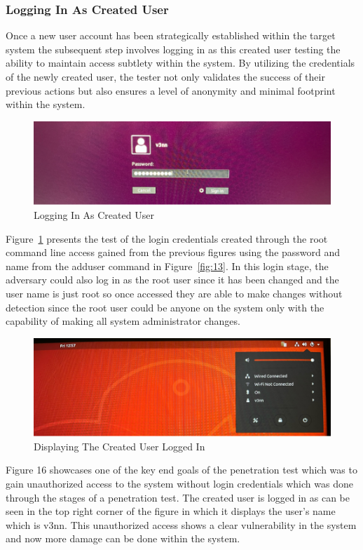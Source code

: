 \documentclass[manuscript,acmsmall,anonymous,review,screen,nonacm=true, authorversion=true]{acmart}
\begin{document}
\subsubsection{Logging In As Created User}
Once a new user account has been strategically established within the target system the
subsequent step involves logging in as this created user testing the ability to maintain access
subtlety within the system. By utilizing the credentials of the newly created user, the tester
not only validates the success of their previous actions but also ensures a level of anonymity and
minimal footprint within the system.
\begin{figure}
    \centering
    \includegraphics{pict/Picture15.png}
    \caption{Logging In As Created User}
    \label{fig:15}
\end{figure}

Figure~\ref{fig:15} presents the test of the login credentials created through the root command line
access gained from the previous figures using the password and name from the adduser
command in Figure~\ref{fig:13}. In this login stage, the adversary could also log in as the root user
since it has been changed and the user name is just root so once accessed they are able to make
changes without detection since the root user could be anyone on the system only with the
capability of making all system administrator changes.
\begin{figure}
    \centering
    \includegraphics{pict/Picture16.png}
    \caption{Displaying The Created User Logged In}
    \label{fig:16}
\end{figure}
Figure 16 showcases one of the key end goals of the penetration test which was to gain
unauthorized access to the system without login credentials which was done through the stages
of a penetration test. The created user is logged in as can be seen in the top right corner of
the figure in which it displays the user’s name which is v3nn. This unauthorized access shows a
clear vulnerability in the system and now more damage can be done within the system.
\end{document}
